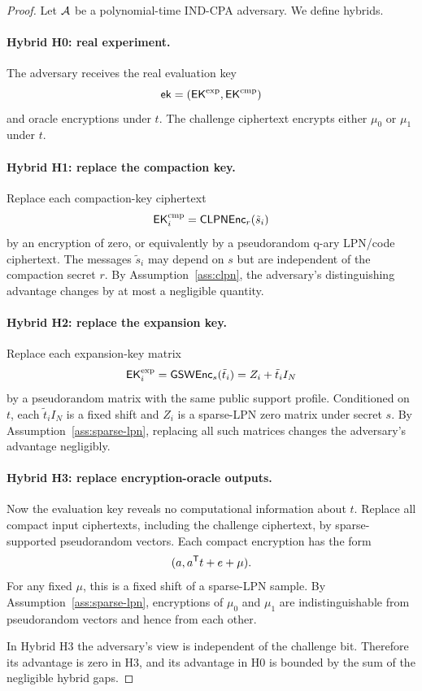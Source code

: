 \begin{proof}
Let $\mathcal{A}$ be a polynomial-time IND-CPA adversary.  We define hybrids.

\paragraph{Hybrid H0: real experiment.}
The adversary receives the real evaluation key
\[
    \mathsf{ek}=(\mathsf{EK}^{\rm exp},\mathsf{EK}^{\rm cmp})
\]
and oracle encryptions under $t$.  The challenge ciphertext encrypts either $\mu_0$ or $\mu_1$ under $t$.

\paragraph{Hybrid H1: replace the compaction key.}
Replace each compaction-key ciphertext
\[
    \mathsf{EK}^{\rm cmp}_i=\mathsf{CLPN}\mathsf{Enc}_r(\tilde{s}_i)
\]
by an encryption of zero, or equivalently by a pseudorandom q-ary LPN/code ciphertext.  The messages $\tilde{s}_i$ may depend on $s$ but are independent of the compaction secret $r$.  By Assumption~\ref{ass:clpn}, the adversary's distinguishing advantage changes by at most a negligible quantity.

\paragraph{Hybrid H2: replace the expansion key.}
Replace each expansion-key matrix
\[
    \mathsf{EK}^{\rm exp}_i=\mathsf{GSW}\mathsf{Enc}_s(\tilde{t}_i)=Z_i+\tilde{t}_iI_N
\]
by a pseudorandom matrix with the same public support profile.  Conditioned on $t$, each $\tilde{t}_iI_N$ is a fixed shift and $Z_i$ is a sparse-LPN zero matrix under secret $s$.  By Assumption~\ref{ass:sparse-lpn}, replacing all such matrices changes the adversary's advantage negligibly.

\paragraph{Hybrid H3: replace encryption-oracle outputs.}
Now the evaluation key reveals no computational information about $t$.  Replace all compact input ciphertexts, including the challenge ciphertext, by sparse-supported pseudorandom vectors.  Each compact encryption has the form
\[
    (a,a^{\mathsf T} t+e+\mu).
\]
For any fixed $\mu$, this is a fixed shift of a sparse-LPN sample.  By Assumption~\ref{ass:sparse-lpn}, encryptions of $\mu_0$ and $\mu_1$ are indistinguishable from pseudorandom vectors and hence from each other.

In Hybrid H3 the adversary's view is independent of the challenge bit.  Therefore its advantage is zero in H3, and its advantage in H0 is bounded by the sum of the negligible hybrid gaps.
\end{proof}


